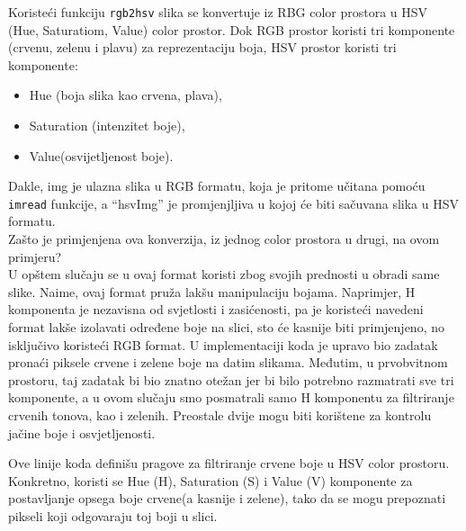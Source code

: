 \documentclass[a4paper,12pt]{article}
\begin{document}


Koristeći funkciju \texttt{rgb2hsv} slika se konvertuje iz RBG color prostora u HSV (Hue, Saturatiom, Value) color prostor. Dok RGB prostor koristi tri komponente (crvenu, zelenu i plavu) za reprezentaciju boja, HSV prostor koristi tri komponente:\\
\begin{itemize}
    \item Hue (boja slika kao crvena, plava),
    \item Saturation (intenzitet boje),
    \item Value(osvijetljenost boje).
\end{itemize}

Dakle, img je ulazna slika u RGB formatu, koja je pritome učitana pomoću \texttt {imread} funkcije, a “hsvImg” je promjenjljiva u kojoj će biti sačuvana slika u HSV formatu. \\

\indent Zašto je primjenjena ova konverzija, iz jednog color prostora u drugi, na ovom primjeru?\\

U opštem slučaju se u ovaj format koristi zbog svojih prednosti u obradi same slike. Naime, ovaj format pruža lakšu manipulaciju bojama. Naprimjer, H komponenta je nezavisna od svjetlosti i zasićenosti, pa je koristeći navedeni format lakše izolavati određene boje na slici, sto će kasnije biti primjenjeno, no isključivo koristeći RGB format. U implementaciji koda je upravo bio zadatak pronaći piksele crvene i zelene boje na datim slikama. Međutim, u prvobvitnom prostoru, taj zadatak bi bio znatno otežan jer bi bilo potrebno razmatrati sve tri komponente, a u ovom slučaju smo posmatrali samo H komponentu za filtriranje crvenih tonova, kao i zelenih. Preostale dvije mogu biti korištene za kontrolu jačine boje i osvjetljenosti. 



Ove linije koda definišu pragove za filtriranje crvene boje u HSV color prostoru. Konkretno, koristi se Hue (H), Saturation (S) i Value (V) komponente za postavljanje opsega boje crvene(a kasnije i zelene), tako da se mogu prepoznati pikseli koji odgovaraju toj boji u slici.



\newpage
\end{document}
